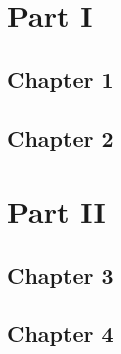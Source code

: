 \documentclass[10pt,final]{memoir} %
\begin{document}
\frontmatter





\halftitle
\titlepage
\copyrightpage

\setupshorttoc
\tableofcontents*
\thispagestyle{empty}



\mainmatter
\part{Part I}
\chapter{Chapter 1}
    
\chapter{Chapter 2}
    

\part{Part II}
\chapter{Chapter 3}
    
\chapter{Chapter 4}
    
\end{document}
